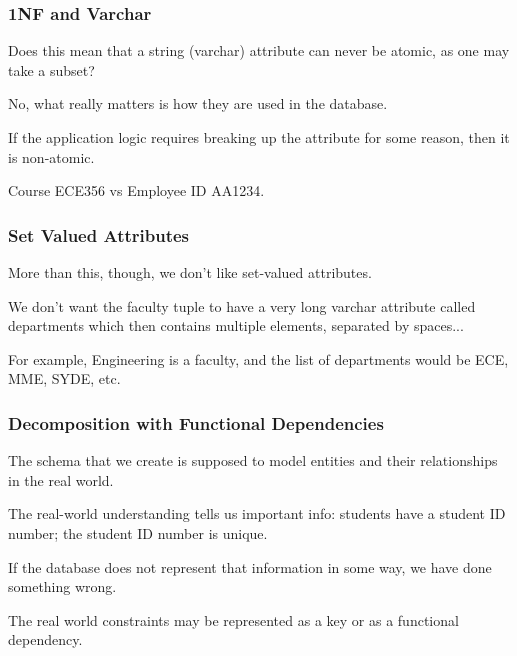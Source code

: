 \begin{frame}
\frametitle{1NF and Varchar}

Does this mean that a string (varchar) attribute can never be atomic, as one may take a subset? 

No, what really matters is how they are used in the database. 

If the application logic requires breaking up the attribute for some reason, then it is non-atomic. 

Course ECE356 vs Employee ID AA1234.

\end{frame}



\begin{frame}
\frametitle{Set Valued Attributes}

More than this, though, we don't like set-valued attributes. 

We don't want the faculty tuple to have a very long varchar attribute called departments which then contains multiple elements, separated by spaces... 

For example, Engineering is a faculty, and the list of departments would be ECE, MME, SYDE, etc. 

\end{frame}



\begin{frame}
\frametitle{Decomposition with Functional Dependencies}

The schema that we create is supposed to model entities and their relationships in the real world. 

The real-world understanding tells us important info: students have a student ID number; the student ID number is unique. 

If the database does not represent that information in some way, we have done something wrong. 

The real world constraints may be represented as a key or as a functional dependency.

\end{frame}


